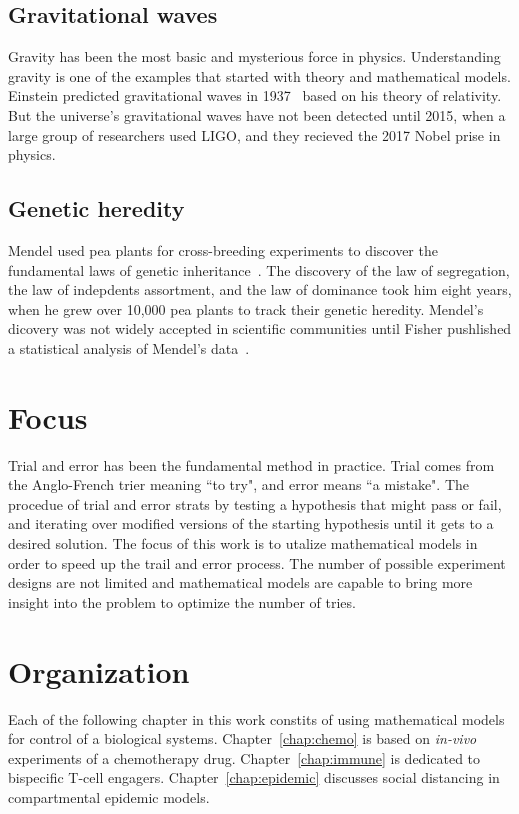 \subsection{Gravitational waves}

Gravity has been the most basic and mysterious force in physics.
Understanding gravity is one of the examples that started with theory and mathematical models. 
Einstein predicted gravitational waves in 1937~\cite{einstein1937gravitational} based on his theory of relativity. 
But the universe's gravitational waves have not been detected until 2015, when a large group of researchers used \ac{LIGO}, and they recieved the 2017 Nobel prise in physics.

\subsection{Genetic heredity}

Mendel used pea plants for cross-breeding experiments to discover the fundamental laws of genetic inheritance~\cite{mendel1996experiments}.
The discovery of the law of segregation, the law of indepdents assortment, and the law of dominance took him eight years, when he grew over 10,000 pea plants to track their genetic heredity.
Mendel's dicovery was not widely accepted in scientific communities until Fisher pushlished a statistical analysis of Mendel's data~\cite{fisher1919xv}.


\section{Focus}

Trial and error has been the fundamental method in practice. Trial comes from the Anglo-French trier meaning ``to try", and error means ``a mistake". 
The procedue of trial and error strats by testing a hypothesis that might pass or fail, and iterating over modified versions of the starting hypothesis until it gets to a desired solution.
The focus of this work is to utalize mathematical models in order to speed up the trail and error process. 
The number of possible experiment designs are not limited and mathematical models are capable to bring more insight into the problem to optimize the number of tries.

\section{Organization}

Each of the following chapter in this work constits of using mathematical models for control of a biological systems. 
Chapter~\ref{chap:chemo} is based on \textit{in-vivo} experiments of a chemotherapy drug.
Chapter~\ref{chap:immune} is dedicated to bispecific T-cell engagers. 
Chapter~\ref{chap:epidemic} discusses social distancing in compartmental epidemic models.
